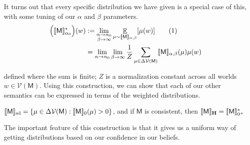 \documentclass{article}
\newcommand\numberthis{\addtocounter{equation}{1}\tag{\theequation}}
\newcommand\SD{_{\text{sd}}}
\newcommand\MaxEnt{_{\mathbf H}}
\newcommand{\V}{\mathcal V}
\newcommand{\sfM}{\mathsf M}
\numberwithin{equation}{section}
\begin{document}
	It turns out that every specific distribution we have given is a special case of this, with some tuning of our $\alpha$ and $\beta$ parameters. 
	\begin{align*}
		\Big(\bbr{\sfM}_{\alpha_0}^*\Big)(w) &:= \lim_{\substack{\alpha \to \alpha_0 \\ \beta \to \infty}} 
		\E_{\mu \sim \bbr{\sfM}_{\alpha,\beta}} [\mu(w)] \numberthis\label{eqn:higher-expectation} \\
		&= \lim_{\alpha \to \alpha_0 } \lim_{\beta \to \infty}  \frac{1}{Z} \sum_{\mu \in \Delta\V(\sfM)} \bbr{\sfM}_{\alpha,\beta}(\mu) \mu(w) 
	\end{align*}
	
	defined where the sum is finite; $Z$ is a normalization constant across all worlds $w \in \V(\sfM)$. 
	Using this construction, we can show that each of our other semantics can be expressed in terms of the weighted distributions.
	
	\begin{prop}
		$\bbr{\sfM}\SD = \{ \mu \in \Delta \V(\sfM) : \bbr{\sfM}_0 (\mu) > 0 \}$, 
		and if $\sfM$ is consistent, then $\bbr{\sfM}\MaxEnt = \bbr{\sfM}_{0^+}^*$
	\end{prop}
	
	The important feature of this construction is that it gives us a uniform way of getting distributions based on our confidence in our beliefs.

	
	
\end{document}

